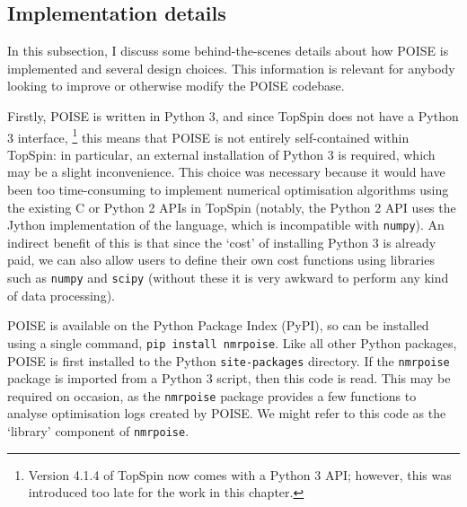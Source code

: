 \subsection{Implementation details}
\label{subsec:poise__implementation}

In this subsection, I discuss some behind-the-scenes details about how POISE is implemented and several design choices.
This information is relevant for anybody looking to improve or otherwise modify the POISE codebase.

Firstly, POISE is written in Python 3, and since TopSpin does not have a Python 3 interface,%
\footnote{Version 4.1.4 of TopSpin now comes with a Python 3 API; however, this was introduced too late for the work in this chapter.}
this means that POISE is not entirely self-contained within TopSpin: in particular, an external installation of Python 3 is required, which may be a slight inconvenience.
This choice was necessary because it would have been too time-consuming to implement numerical optimisation algorithms using the existing C or Python 2 APIs in TopSpin (notably, the Python 2 API uses the Jython implementation of the language, which is incompatible with \texttt{numpy}).
An indirect benefit of this is that since the `cost' of installing Python 3 is already paid, we can also allow users to define their own cost functions using libraries such as \texttt{numpy} and \texttt{scipy} (without these it is very awkward to perform any kind of data processing).

POISE is available on the Python Package Index (PyPI), so can be installed using a single command, \texttt{pip install nmrpoise}.
Like all other Python packages, POISE is first installed to the Python \texttt{site-packages} directory.
If the \texttt{nmrpoise} package is imported from a Python 3 script, then this code is read.
This may be required on occasion, as the \texttt{nmrpoise} package provides a few functions to analyse optimisation logs created by POISE.
We might refer to this code as the `library' component of \texttt{nmrpoise}.

